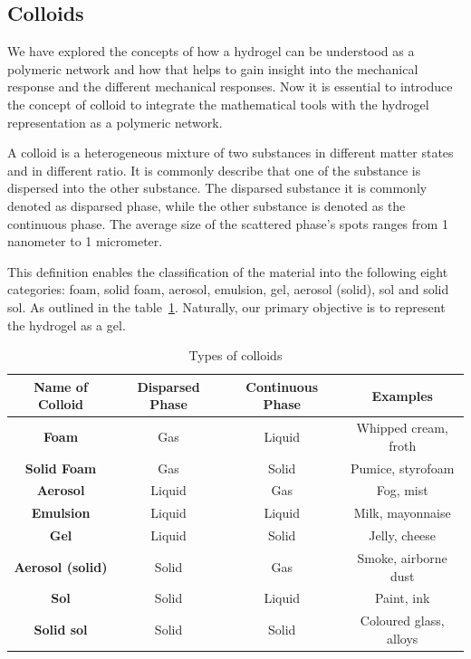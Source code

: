 \subsection{Colloids}

We have explored the concepts of how a hydrogel can be understood as a polymeric network and how that helps to gain insight into the mechanical response and the different mechanical responses.
Now it is essential to introduce the concept of colloid to integrate the mathematical tools with the hydrogel representation as a polymeric network.

A colloid is a heterogeneous mixture of two substances in different matter states and in different ratio\citep{castaneda-priegoColloidalSoftMatter2021}.
It is commonly describe that one of the substance is dispersed into the other substance.
The disparsed substance it is commonly denoted as disparsed phase, while the other substance is denoted as the continuous phase.
The average size of the scattered phase's spots ranges from 1 nanometer to 1 micrometer.

This definition enables the classification of the material into the following eight categories:
foam, solid foam,
aerosol, emulsion, gel,
aerosol (solid), sol and solid sol.
As outlined in the table~\ref{tab:colloids}.
Naturally, our primary objective is to represent the hydrogel as a gel.

\begin{table}[ht!]
\begin{tabular}{|c|c|c|c|}
\hline
\textbf{Name of Colloid} & \textbf{Disparsed Phase} & \textbf{Continuous Phase} & \textbf{Examples}      \\ \hline
\textbf{Foam}            & Gas                      & Liquid                    & Whipped cream, froth   \\ \hline
\textbf{Solid Foam}      & Gas                      & Solid                     & Pumice, styrofoam      \\ \hline
\textbf{Aerosol}         & Liquid                   & Gas                       & Fog, mist              \\ \hline
\textbf{Emulsion}        & Liquid                   & Liquid                    & Milk, mayonnaise       \\ \hline
\textbf{Gel}             & Liquid                   & Solid                     & Jelly, cheese          \\ \hline
\textbf{Aerosol (solid)} & Solid                    & Gas                       & Smoke, airborne dust   \\ \hline
\textbf{Sol}             & Solid                    & Liquid                    & Paint, ink             \\ \hline
\textbf{Solid sol}       & Solid                    & Solid                     & Coloured glass, alloys \\ \hline
\end{tabular}
\caption{Types of colloids}\label{tab:colloids}
\end{table}

